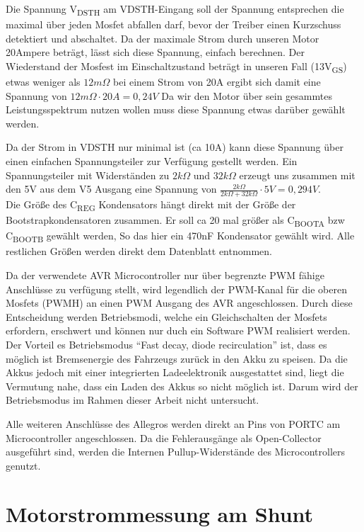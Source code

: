 Die Spannung V\textsubscript{DSTH} am VDSTH-Eingang soll der Spannung entsprechen die maximal über jeden Mosfet abfallen darf, bevor der Treiber einen Kurzschuss detektiert 
und abschaltet. Da der maximale Strom durch unseren Motor 20Ampere beträgt, lässt sich diese Spannung, einfach berechnen. Der Wiederstand der Mosfest im Einschaltzustand beträgt
in unseren Fall (13V\textsubscript{GS}) etwas weniger als $12m\Omega$  bei einem Strom von 20A ergibt sich damit eine Spannung von $12m\Omega \cdot 20A = 0,24V$
Da wir den Motor über sein gesammtes Leistungsspektrum nutzen wollen muss diese Spannung etwas darüber gewählt werden.

Da der Strom in VDSTH nur minimal ist (ca 10\textmu A) kann diese Spannung über einen einfachen Spannungsteiler zur Verfügung gestellt werden. Ein Spannungsteiler mit 
Widerständen zu $2k\Omega$ und $32k\Omega$ erzeugt uns zusammen mit den 5V aus dem V5 Ausgang eine Spannung von $\frac{2k\Omega}{2k\Omega+32k\Omega}\cdot 5V =0,294 V$.\\


Die Größe des C\textsubscript{REG} Kondensators hängt direkt mit der Größe der Bootstrapkondensatoren zusammen. Er soll ca 20 mal größer als
C\textsubscript{BOOTA} bzw C\textsubscript{BOOTB} gewählt werden, So das hier ein 470nF Kondensator gewählt wird.
Alle restlichen Größen werden direkt dem Datenblatt entnommen.

Da der verwendete AVR Microcontroller nur über begrenzte PWM fähige Anschlüsse zu verfügung stellt, wird legendlich der PWM-Kanal für die oberen Mosfets (PWMH) an einen PWM Ausgang des AVR angeschlossen.
Durch diese Entscheidung werden Betriebsmodi, welche ein Gleichschalten der Mosfets erfordern, erschwert und können nur duch ein Software PWM realisiert werden. Der Vorteil es Betriebsmodus ``Fast decay, diode recirculation''
ist, dass es möglich ist Bremsenergie des Fahrzeugs zurück in den Akku zu speisen. Da die Akkus jedoch mit einer integrierten Ladeelektronik ausgestattet sind, liegt die Vermutung nahe, dass ein Laden des Akkus so nicht möglich ist.
Darum wird der Betriebsmodus im Rahmen dieser Arbeit nicht untersucht.

Alle weiteren Anschlüsse des Allegros werden direkt an Pins von PORTC am Microcontroller angeschlossen. Da die Fehlerausgänge als Open-Collector ausgeführt sind, werden die Internen Pullup-Widerstände des Microcontrollers genutzt.



\section{Motorstrommessung am Shunt}

